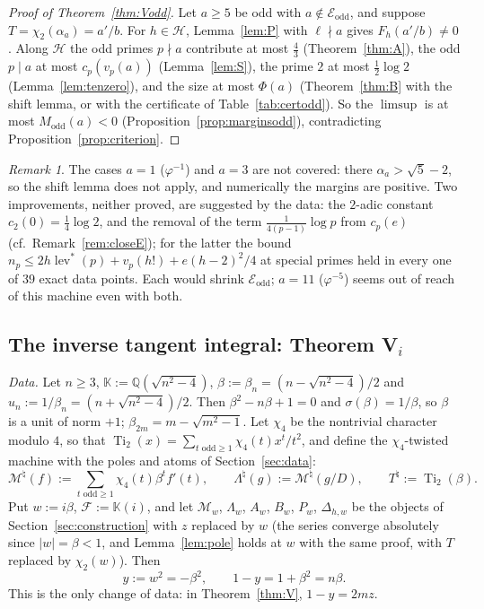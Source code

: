 \documentclass[11pt]{amsart}
\theoremstyle{definition}
\theoremstyle{remark}
\newtheorem{remark}[theorem]{Remark}
\numberwithin{equation}{section}
\newcommand{\QQ}{\mathbb{Q}}
\newcommand{\KK}{\mathbb{K}}
\newcommand{\cF}{\mathcal{F}}
\newcommand{\cM}{\mathcal{M}}
\newcommand{\cE}{\mathcal{E}}
\newcommand{\lev}{\operatorname{lev}^{*}}
\newcommand{\Ti}{\operatorname{Ti}}
\begin{document}
\begin{proof}[Proof of Theorem~\ref{thm:Vodd}]
Let $a\ge5$ be odd with $a\notin\cE_{\mathrm{odd}}$, and suppose $T=\chi_2(\alpha_a)=a'/b$. For $h\in\mathcal H$,
Lemma~\ref{lem:P} with $\ell\nmid a$ gives $F_h(a'/b)\ne0$. Along $\mathcal H$ the odd primes $p\nmid a$ contribute at
most $\frac43$ (Theorem~\ref{thm:A}), the odd $p\mid a$ at most $c_p(v_p(a))$ (Lemma~\ref{lem:S}), the prime $2$ at most
$\frac12\log2$ (Lemma~\ref{lem:tenzero}), and the size at most $\Phi(a)$ (Theorem~\ref{thm:B} with the shift lemma, or
with the certificate of Table~\ref{tab:certodd}). So the $\limsup$ is at most $M_{\mathrm{odd}}(a)<0$
(Proposition~\ref{prop:marginsodd}), contradicting Proposition~\ref{prop:criterion}.
\end{proof}

\begin{remark}
The cases $a=1$ ($\varphi^{-1}$) and $a=3$ are not covered: there $\alpha_a>\sqrt5-2$, so the shift lemma does not apply,
and numerically the margins are positive. Two improvements, neither proved, are suggested by the data: the $2$-adic
constant $c_2(0)=\frac14\log2$, and the removal of the term $\frac1{4(p-1)}\log p$ from $c_p(e)$ (cf.\
Remark~\ref{rem:closeE}); for the latter the bound $n_p\le2h\lev(p)+v_p(h!)+e(h-2)^2/4$ at special primes held in every
one of $39$ exact data points. Each would shrink $\cE_{\mathrm{odd}}$; $a=11$ ($\varphi^{-5}$) seems out of reach of this
machine even with both.
\end{remark}

\subsection{The inverse tangent integral: Theorem V\texorpdfstring{$_i$}{\_i}}\label{sec:Ti2}
\emph{Data.} Let $n\ge3$, $\KK:=\QQ(\sqrt{n^2-4})$, $\beta:=\beta_n=(n-\sqrt{n^2-4})/2$ and $u_n:=1/\beta_n=(n+\sqrt{n^2-4})/2$.
Then $\beta^2-n\beta+1=0$ and $\sigma(\beta)=1/\beta$, so $\beta$ is a unit of norm $+1$; $\beta_{2m}=m-\sqrt{m^2-1}$. Let
$\chi_4$ be the nontrivial character modulo $4$, so that $\Ti_2(x)=\sum_{t\text{ odd}\ge1}\chi_4(t)x^t/t^2$, and define the
$\chi_4$-twisted machine with the poles and atoms of Section~\ref{sec:data}:
\[
  \cM^\natural(f):=\sum_{t\text{ odd}\ge1}\chi_4(t)\beta^tf'(t),\qquad\Lambda^\natural(g):=\cM^\natural(g/D),\qquad
  T^\natural:=\Ti_2(\beta).
\]
Put $w:=i\beta$, $\cF:=\KK(i)$, and let $\cM_w$, $\Lambda_w$, $A_w$, $B_w$, $P_w$, $\Delta_{h,w}$ be the objects of
Section~\ref{sec:construction} with $z$ replaced by $w$ (the series converge absolutely since $|w|=\beta<1$, and
Lemma~\ref{lem:pole} holds at $w$ with the same proof, with $T$ replaced by $\chi_2(w)$). Then
\[
  y:=w^2=-\beta^2,\qquad 1-y=1+\beta^2=n\beta .
\]
This is the only change of data: in Theorem~\ref{thm:V}, $1-y=2mz$.
\end{document}
